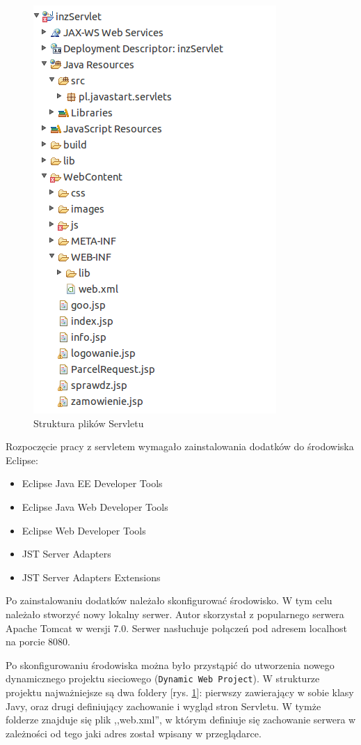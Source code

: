\documentclass[eng,printmode,oneside]{mgr}
\begin{document}
\begin{figure}
\centering
\captionsetup{justification=centering,margin=0cm}
\vspace{-10pt}
\begin{center}
\includegraphics[width=.35\textwidth]{strukturaServlet.png}
\end{center}
\vspace{-10pt}
  \caption{Struktura plików Servletu}
\label{fig:servlet}
\vspace{-60pt}
\end{figure}

Rozpoczęcie pracy z servletem wymagało zainstalowania dodatków do środowiska
Eclipse:
\begin{itemize}
  \item Eclipse Java EE Developer Tools
  \item Eclipse Java Web Developer Tools
  \item Eclipse Web Developer Tools
  \item JST Server Adapters
  \item JST Server Adapters Extensions
\end{itemize}

Po zainstalowaniu dodatków należało skonfigurować środowisko. W tym celu
należało stworzyć nowy lokalny serwer. Autor skorzystał z popularnego serwera Apache
Tomcat w wersji 7.0. Serwer nasłuchuje połączeń pod adresem localhost na
porcie 8080.

Po skonfigurowaniu środowiska można było przystąpić do utworzenia nowego
dynamicznego projektu sieciowego (\texttt{Dynamic Web Project}). W strukturze
projektu najważniejsze są dwa foldery [rys. \ref{fig:servlet}]: pierwszy
zawierający w sobie klasy Javy, oraz drugi definiujący zachowanie i wygląd stron Servletu.
W tymże folderze znajduje się plik ,,web.xml'', w którym definiuje się
zachowanie serwera w zależności od tego jaki adres został wpisany w
przeglądarce.
\end{document}
